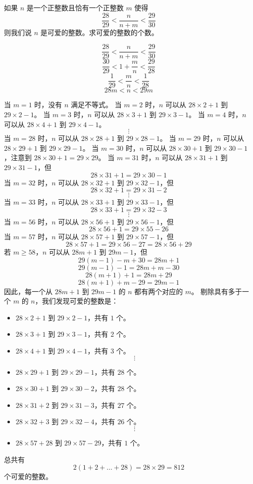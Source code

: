 \begin{questions}
        \question 如果 $n$ 是一个正整数且恰有一个正整数 $m$ 使得
\[ \frac{28}{29} < \frac{n}{n+m} < \frac{29}{30} \]
则我们说 $n$ 是可爱的整数。求可爱的整数的个数。

\begin{solution}
\[ \frac{28}{29} < \frac{n}{n+m} < \frac{29}{30} \]
\[ \frac{30}{29} < 1 + \frac{m}{n} < \frac{29}{28} \]
\[ \frac{1}{29} < \frac{m}{n} < \frac{1}{28} \]
\[ 28m < n < 29m \]

当 $m=1$ 时，没有 $n$ 满足不等式。
当 $m=2$ 时，$n$ 可以从 $28 \times 2 + 1$ 到 $29 \times 2 - 1$。
当 $m=3$ 时，$n$ 可以从 $28 \times 3 + 1$ 到 $29 \times 3 - 1$。
当 $m=4$ 时，$n$ 可以从 $28 \times 4 + 1$ 到 $29 \times 4 - 1$。
\[ \vdots \]
当 $m=28$ 时，$n$ 可以从 $28 \times 28 + 1$ 到 $29 \times 28 - 1$。
当 $m=29$ 时，$n$ 可以从 $28 \times 29 + 1$ 到 $29 \times 29 - 1$。
当 $m=30$ 时，$n$ 可以从 $28 \times 30 + 1$ 到 $29 \times 30 - 1$，注意到 $28 \times 30 + 1 = 29 \times 29$。
当 $m=31$ 时，$n$ 可以从 $28 \times 31 + 1$ 到 $29 \times 31 - 1$，但
\[ 28 \times 31 + 1 = 29 \times 30 - 1 \]
当 $m=32$ 时，$n$ 可以从 $28 \times 32 + 1$ 到 $29 \times 32 - 1$，但
\[ 28 \times 32 + 1 = 29 \times 31 - 2 \]
\[ \vdots \]
当 $m=33$ 时，$n$ 可以从 $28 \times 33 + 1$ 到 $29 \times 33 - 1$，但
\[ 28 \times 33 + 1 = 29 \times 32 - 3 \]
\[ \vdots \]
当 $m=56$ 时，$n$ 可以从 $28 \times 56 + 1$ 到 $29 \times 56 - 1$，但
\[ 28 \times 56 + 1 = 29 \times 55 - 26 \]
当 $m=57$ 时，$n$ 可以从 $28 \times 57 + 1$ 到 $29 \times 57 - 1$，但
\[ 28 \times 57 + 1 = 29 \times 56 - 27 = 28 \times 56 + 29 \]
若 $m \ge 58$，$n$ 可以从 $28m + 1$ 到 $29m - 1$，但
\[ 29(m - 1) - m + 30 = 28m + 1 \]
\[ 29(m - 1) - 1 = 28m + m - 30 \]
\[ 28(m + 1) + 1 = 28m + 29 \]
\[ 28(m + 1) + m - 29 = 29m - 1 \]
因此，每一个从 $28m + 1$ 到 $29m - 1$ 的 $n$ 都有两个对应的 $m$。
剔除具有多于一个 $m$ 的 $n$，我们发现可爱的整数是：
\begin{itemize}
    \item $28 \times 2 + 1$ 到 $29 \times 2 - 1$，共有 $1$ 个。
    \item $28 \times 3 + 1$ 到 $29 \times 3 - 1$，共有 $2$ 个。
    \item $28 \times 4 + 1$ 到 $29 \times 4 - 1$，共有 $3$ 个。
    \[ \vdots \]
    \item $28 \times 29 + 1$ 到 $29 \times 29 - 1$，共有 $28$ 个。
    \item $28 \times 30 + 1$ 到 $29 \times 30 - 2$，共有 $28$ 个。
    \item $28 \times 31 + 2$ 到 $29 \times 31 - 3$，共有 $27$ 个。
    \item $28 \times 32 + 3$ 到 $29 \times 32 - 4$，共有 $26$ 个。
    \[ \vdots \]
    \item $28 \times 57 + 28$ 到 $29 \times 57 - 29$，共有 $1$ 个。
\end{itemize}
总共有
\[ 2(1 + 2 + \dots + 28) = 28 \times 29 = 812 \]
个可爱的整数。
\end{solution}


\end{questions}
